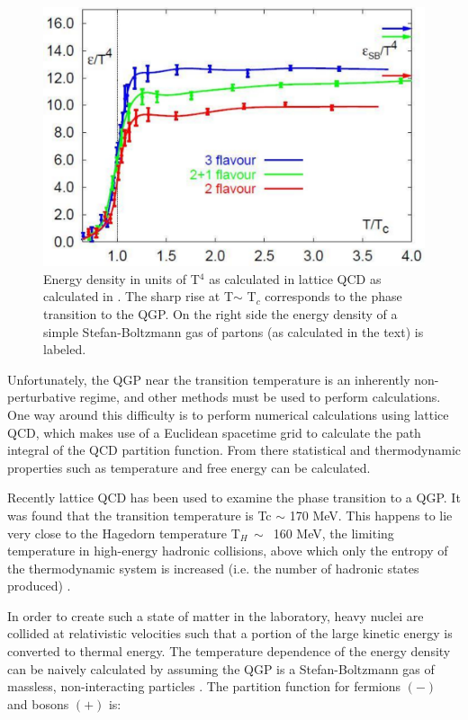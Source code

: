 \begin{figure}
  \includegraphics[width=\hugefigwidth]{chap_SMAndQGP_figures/LatticeQCD}
  \caption[QCD Phase diagram]
  {Energy density in units of T$^4$ as calculated in lattice QCD as calculated in \cite{LQCD1}. The
sharp rise at T$\sim$ T$_c$ corresponds to the phase transition to the QGP. On the right side the energy
density of a simple Stefan-Boltzmann gas of partons (as calculated in the text) is labeled.}
  \label{fig:LatticeQCD}
\end{figure}


Unfortunately, the QGP near the transition temperature is an inherently non-perturbative
regime, and other methods must be used to perform calculations. One way around this difficulty
is to perform numerical calculations using lattice QCD, which makes use of a Euclidean spacetime
grid to calculate the path integral of the QCD partition function. From there statistical and
thermodynamic properties such as temperature and free energy can be calculated.

Recently lattice QCD has been used to examine the phase transition to a QGP. It was found
that the transition temperature is Tc $\sim$ 170 MeV. This happens to lie very close to the Hagedorn
temperature T$_H\,\sim\,$ 160 MeV, the limiting temperature in high-energy hadronic collisions, above
which only the entropy of the thermodynamic system is increased (i.e. the number of hadronic
states produced) \cite{Hagedron}.

In order to create such a state of matter in the laboratory, heavy nuclei are collided at
relativistic velocities such that a portion of the large kinetic energy is converted to thermal energy.
The temperature dependence of the energy density can be naively calculated by assuming
the QGP is a Stefan-Boltzmann gas of massless, non-interacting particles \cite{WongBook,RamonaBook}. The partition
function for fermions $(-)$ and bosons $(+)$ is:


